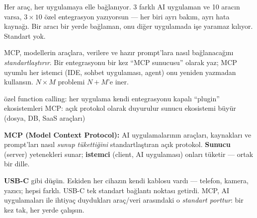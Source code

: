 

Her araç, her uygulamaya elle bağlanıyor. 3 farklı AI uygulaman ve 10 aracın
varsa, $3\times10$ özel entegrasyon yazıyorsun --- her biri ayrı bakım, ayrı
hata kaynağı. Bir aracı bir yerde bağlaman, onu diğer uygulamada işe yaramaz
kılıyor. Standart yok.


MCP, modellerin araçlara, verilere ve hazır prompt'lara nasıl bağlanacağını
\emph{standartlaştırır}. Bir entegrasyonu bir kez ``MCP sunucusu'' olarak yaz;
MCP uyumlu her istemci (IDE, sohbet uygulaması, agent) onu yeniden yazmadan
kullansın. $N\times M$ problemi $N+M$'e iner.

\begin{timeline}
 özel function calling: her uygulama kendi entegrasyonu \tlsep {} kapalı ``plugin'' ekosistemleri \tlsep {} MCP: açık protokol olarak duyurulur \tlsep {} sunucu ekosistemi büyür (dosya, DB, SaaS araçları)
\end{timeline}

\begin{problembox}
\textbf{MCP (Model Context Protocol):} AI uygulamalarının araçları, kaynakları
ve prompt'ları nasıl \emph{sunup tükettiğini} standartlaştıran açık protokol.
\textbf{Sunucu} (server) yetenekleri sunar; \textbf{istemci} (client, AI
uygulaması) onları tüketir --- ortak bir dille.
\end{problembox}

\begin{mentalbox}
\textbf{USB-C} gibi düşün. Eskiden her cihazın kendi kablosu vardı --- telefon,
kamera, yazıcı; hepsi farklı. USB-C tek standart bağlantı noktası getirdi. MCP,
AI uygulamaları ile ihtiyaç duydukları araç/veri arasındaki o \emph{standart
porttur}: bir kez tak, her yerde çalışsın.
\end{mentalbox}

